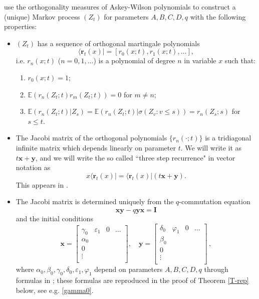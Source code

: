 \documentclass{amsart}
\theoremstyle{definition}
\theoremstyle{remark}
\theoremstyle{remark}
\theoremstyle{definition}
\numberwithin{equation}{section}
\begin{document}
\citet{Bryc-Wesolowski-08} use the orthogonality measures of Askey-Wilson polynomials to construct a (unique) Markov process $(Z_t)$ for
 parameters $A,B,C,D,q$ with the following properties:
 \begin{itemize}
   \item $(Z_t)$ has a sequence of orthogonal martingale polynomials $$\langle\mathbf{r}_t(x)|=[r_0(x;t), r_1(x;t),\dots],$$
    i.e.  $r_n(x;t)$ ($n=0,1,\dots$) is a polynomial of degree $n$ in variable $x$ such that:
    \begin{enumerate}
      \item $r_0(x;t)=1$;
      \item ${\mathds{E}}\left(r_n(Z_t;t)r_m(Z_t;t)\right)=0$ for $m\ne n$;
      \item ${\mathds{E}}(r_n(Z_t;t)|Z_s)={\mathds{E}}(r_n(Z_t;t)|\sigma(Z_v:v\leq s))=r_n(Z_s;s)$ for $s\leq t$.
    \end{enumerate}
    \item The Jacobi matrix of the orthogonal polynomials $\{r_n(\cdot;t)\}$ is a tridiagonal infinite matrix which
    depends linearly on parameter $t$. We will write it  as $t{\mathbf{x}}+{\mathbf{y}}$, and we will write the so called ``three step recurrence" in vector notation as
    \begin{equation}
      \label{three-step} x \langle\mathbf{r}_t(x)| = \langle\mathbf{r}_t(x)|(t{\mathbf{x}}+{\mathbf{y}}).
    \end{equation}
    This appears in  \cite[page 1244]{Bryc-Wesolowski-08}.
    \item The Jacobi matrix is determined uniquely from the $q$-commutation equation
    \begin{equation}
      \label{q-comm}
      {\mathbf{x}} {\mathbf{y}} - q {\mathbf{y}} {\mathbf{x}} ={\mathbf{I}}
    \end{equation}
    and the initial conditions  {}
    \begin{equation}
      \label{ini-cond}
      {\mathbf{x}}=\left[\begin{matrix}
        \gamma_0 & {\varepsilon}_1 & 0 &\dots \\
        \alpha_0 & & & \\
        0 & & & \\
        \vdots & & & \\
      \end{matrix}\right], \quad {\mathbf{y}}=\left[\begin{matrix}
        \delta_0 & \varphi_1 & 0 &\dots \\
        \beta_0 & & & \\
        0 & & & \\
        \vdots & & & \\
      \end{matrix}\right]\,,
    \end{equation}
    where $\alpha_0,\beta_0,\gamma_0,\delta_0,{\varepsilon}_1,\varphi_1$ depend on parameters $A,B,C,D,q$ through formulas in
    \cite[page 1243]{Bryc-Wesolowski-08}; these formulas are reproduced in the proof of Theorem \ref{T-rep} below, see e.g.
    \eqref{gamma0}.
 \end{itemize}
\end{document}
